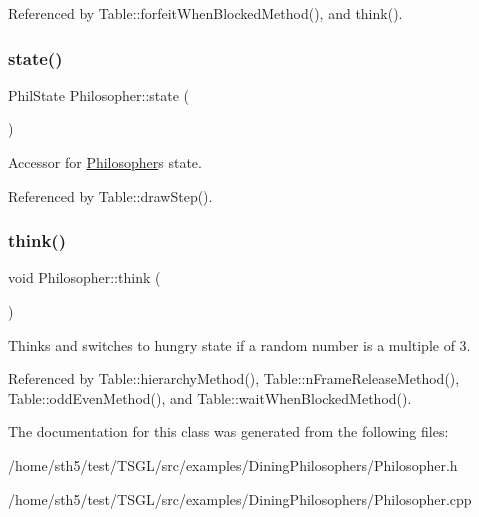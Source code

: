 Referenced by Table\+::forfeit\+When\+Blocked\+Method(), and think().

\mbox{\label{class_philosopher_a04862832ab8b79fd45ddec5e0546775a}} 
\subsubsection{\texorpdfstring{state()}{state()}}
{\footnotesize\ttfamily Phil\+State Philosopher\+::state (\begin{DoxyParamCaption}{ }\end{DoxyParamCaption})\hspace{0.3cm}{\ttfamily [inline]}}

Accessor for \hyperlink{class_philosopher}{Philosopher}\textquotesingle{}s state. 

Referenced by Table\+::draw\+Step().

\mbox{\label{class_philosopher_adb8c98df2b7cf8f2d2cde2daa18c731a}} 
\subsubsection{\texorpdfstring{think()}{think()}}
{\footnotesize\ttfamily void Philosopher\+::think (\begin{DoxyParamCaption}{ }\end{DoxyParamCaption})}

Thinks and switches to hungry state if a random number is a multiple of 3. 

Referenced by Table\+::hierarchy\+Method(), Table\+::n\+Frame\+Release\+Method(), Table\+::odd\+Even\+Method(), and Table\+::wait\+When\+Blocked\+Method().



The documentation for this class was generated from the following files\+:\begin{DoxyCompactItemize}
\item 
/home/sth5/test/\+T\+S\+G\+L/src/examples/\+Dining\+Philosophers/Philosopher.\+h\item 
/home/sth5/test/\+T\+S\+G\+L/src/examples/\+Dining\+Philosophers/Philosopher.\+cpp\end{DoxyCompactItemize}
